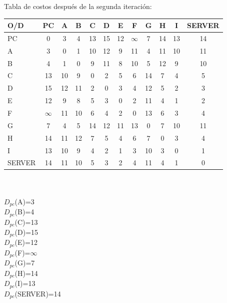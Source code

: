 \documentclass{article}
\begin{document}
Tabla de costos despu\'es de la segunda iteraci\'on:\\
\begin{tabular}{||l | c | c | c | c | c | c | c | c | c | c | c ||}
\hline
\hline
O/D & PC & A & B & C & D & E & F & G & H & I & SERVER \\
\hline
PC & 0 & 3 & 4 & 13 & 15 & 12 & $\infty$ & 7 & 14 & 13 & 14 \\
\hline
A & 3 & 0 & 1 & 10 & 12 & 9 & 11 & 4 & 11 & 10 & 11 \\
\hline
B & 4 & 1 & 0 & 9 & 11 & 8 & 10 & 5 & 12 & 9 & 10 \\
\hline
C & 13 & 10 & 9 & 0 & 2 & 5 & 6 & 14 & 7 & 4 & 5 \\
\hline
D & 15 & 12 & 11 & 2 & 0 & 3 & 4 & 12 & 5 & 2 & 3 \\
\hline
E & 12 & 9 & 8 & 5 & 3 & 0 & 2 & 11 & 4 & 1 & 2 \\
\hline
F & $\infty$ & 11 & 10 & 6 & 4 & 2 & 0 & 13 & 6 & 3 & 4 \\
\hline
G & 7 & 4 & 5 & 14 & 12 & 11 & 13 & 0 & 7 & 10 & 11 \\
\hline
H & 14 & 11 & 12 & 7 & 5 & 4 & 6 & 7 & 0 & 3 & 4 \\
\hline
I & 13 & 10 & 9 & 4 & 2 & 1 & 3 & 10 & 3 & 0 & 1 \\
\hline
SERVER & 14 & 11 & 10 & 5 & 3 & 2 & 4 & 11 & 4 & 1 & 0 \\
\hline
\end{tabular}\\\\

$D_{pc}$(A)=3\\
$D_{pc}$(B)=4\\
$D_{pc}$(C)=13\\
$D_{pc}$(D)=15\\
$D_{pc}$(E)=12\\
$D_{pc}$(F)=$\infty$\\
$D_{pc}$(G)=7\\
$D_{pc}$(H)=14\\
$D_{pc}$(I)=13\\
$D_{pc}$(SERVER)=14\\
\end{document}
